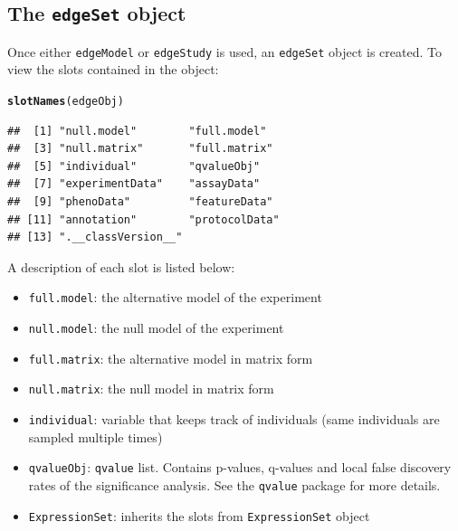 \documentclass{article}\usepackage[]{graphicx}\usepackage[]{color}
\makeatletter
\newcommand{\hlstd}[1]{\textcolor[rgb]{0.345,0.345,0.345}{#1}}%
\newcommand{\hlkwd}[1]{\textcolor[rgb]{0.737,0.353,0.396}{\textbf{#1}}}%
\newenvironment{kframe}{%
 \def\at@end@of@kframe{}%
 \ifinner\ifhmode%
  \def\at@end@of@kframe{\end{minipage}}%
  \begin{minipage}{\columnwidth}%
 \fi\fi%
 \def\FrameCommand##1{\hskip\@totalleftmargin \hskip-\fboxsep
 \colorbox{shadecolor}{##1}\hskip-\fboxsep
     \hskip-\linewidth \hskip-\@totalleftmargin \hskip\columnwidth}%
 \MakeFramed {\advance\hsize-\width
   \@totalleftmargin\z@ \linewidth\hsize
   \@setminipage}}%
 {\par\unskip\endMakeFramed%
 \at@end@of@kframe}
\newenvironment{knitrout}{}{} %
\makeatother
\begin{document}
\subsection{The {\tt edgeSet} object}
Once either {\tt edgeModel} or {\tt edgeStudy} is used, an {\tt edgeSet} object is created. To view the slots contained in the object:
\begin{knitrout}
\color{fgcolor}\begin{kframe}
\begin{alltt}
\hlkwd{slotNames}\hlstd{(edgeObj)}
\end{alltt}
\begin{verbatim}
##  [1] "null.model"        "full.model"       
##  [3] "null.matrix"       "full.matrix"      
##  [5] "individual"        "qvalueObj"        
##  [7] "experimentData"    "assayData"        
##  [9] "phenoData"         "featureData"      
## [11] "annotation"        "protocolData"     
## [13] ".__classVersion__"
\end{verbatim}
\end{kframe}
\end{knitrout}
A description of each slot is listed below: 
\begin{itemize}
\item {\tt full.model}: the alternative model of the experiment
\item {\tt null.model}: the null model of the experiment
\item {\tt full.matrix}: the alternative model in matrix form
\item {\tt null.matrix}: the null model in matrix form
\item {\tt individual}: variable that keeps track of individuals (same individuals are sampled multiple times)
\item {\tt qvalueObj}: {\tt qvalue} list. Contains p-values, q-values and local false discovery rates of the significance analysis. See the {\tt qvalue} package for more details.
\item {\tt ExpressionSet}: inherits the slots from {\tt ExpressionSet} object
\end{itemize}
\end{document}
